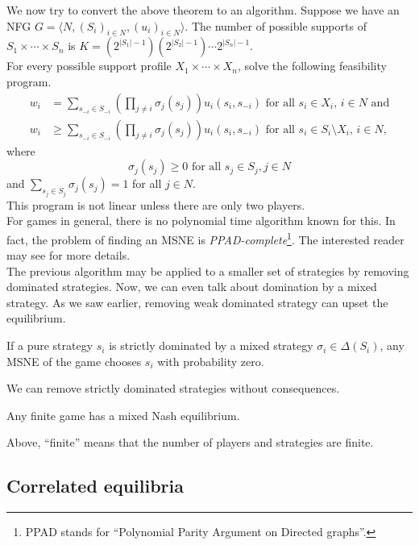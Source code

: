 	We now try to convert the above theorem to an algorithm. Suppose we have an NFG $G = \langle N , (S_i)_{i \in N} , (u_i)_{i \in N} \rangle$. The number of possible supports of $S_1 \times \cdots \times S_n$ is $K = (2^{|S_1|-1})(2^{|S_2|-1})\cdots2^{|S_n|-1}$.\\
	For every possible support profile $X_1 \times \cdots \times X_n$, solve the following feasibility program.
	\begin{align*}
		w_i &= \sum_{s_{-i} \in S_{-i}} \left( \prod_{j \ne i} \sigma_j(s_j) \right) u_i(s_i,s_{-i}) \text{ for all $s_i \in X_i$, $i \in N$ and} \\
		w_i &\ge \sum_{s_{-i} \in S_{-i}} \left( \prod_{j \ne i} \sigma_j(s_j) \right) u_i(s_i,s_{-i}) \text{ for all $s_i \in S_i \setminus X_i$, $i \in N$,}
	\end{align*}
	where
	\[ \sigma_j(s_j) \ge 0 \text{ for all $s_j \in S_j,j\in N$} \]
	and $\sum_{s_j \in S_j} \sigma_j(s_j) = 1$ for all $j \in N$.\\
	This program is not linear unless there are only two players.\\
	For games in general, there is no polynomial time algorithm known for this. In fact, the problem of finding an MSNE is \emph{PPAD-complete}\footnote{PPAD stands for ``Polynomial Parity Argument on Directed graphs''.}. The interested reader may see \cite{Daskalakis2009TheCO} for more details.\\

	The previous algorithm may be applied to a smaller set of strategies by removing dominated strategies. Now, we can even talk about domination by a mixed strategy. As we saw earlier, removing weak dominated strategy can upset the equilibrium. 

	\begin{ftheo}
		If a pure strategy $s_i$ is strictly dominated by a mixed strategy $\sigma_i \in \Delta(S_i)$, any MSNE of the game chooses $s_i$ with probability zero.
	\end{ftheo}
	We can remove strictly dominated strategies without consequences.

	\begin{ftheo}
		Any finite game has a mixed Nash equilibrium.
	\end{ftheo}
	Above, ``finite'' means that the number of players and strategies are finite.


\subsection{Correlated equilibria}


